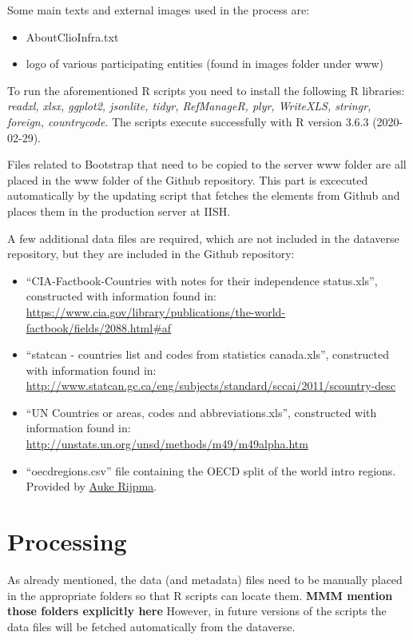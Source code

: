 \documentclass[a4paper]{article}
\begin{document}
Some main texts and external images used in the process are:
\begin{itemize}
 \item AboutClioInfra.txt
 \item logo of various participating entities (found in images folder under www)
\end{itemize}

To run the aforementioned R scripts you need to install the following R 
libraries: \textit{readxl, xlsx, ggplot2, jsonlite, tidyr, RefManageR, plyr, WriteXLS, stringr, 
foreign, countrycode}. The scripts execute successfully with R version 3.6.3 (2020-02-29).

Files related to Bootstrap that need to be copied to the server www folder are 
all placed in the www folder of the Github repository. This part is excecuted 
automatically by the updating script that fetches the elements from Github and 
places them in the production server at IISH.

A few additional data files are required, which are not included in the 
dataverse repository, but they are included in the Github repository:
\begin{itemize}
 \item ``CIA-Factbook-Countries with notes for their independence status.xls'', 
constructed with information found in: 
\url{
https://www.cia.gov/library/publications/the-world-factbook/fields/2088.html#af}
 \item ``statcan - countries list and codes from statistics canada.xls'', 
constructed with information found in: 
\url{http://www.statcan.gc.ca/eng/subjects/standard/sccai/2011/scountry-desc}
 \item ``UN Countries or areas, codes and abbreviations.xls'', constructed with 
information found in:
\url{http://unstats.un.org/unsd/methods/m49/m49alpha.htm}
\item ``oecdregions.csv'' file containing the OECD split of the world intro 
regions. Provided by \href{https://www.uu.nl/staff/ARijpma}{Auke Rijpma}.
\end{itemize}

\section{Processing}

As already mentioned, the data (and metadata) files need to be manually placed 
in the appropriate folders so that R scripts can locate them. \textbf{MMM 
mention those folders explicitly here} However, in future versions of the 
scripts the data files will be fetched automatically from the dataverse.
\end{document}
